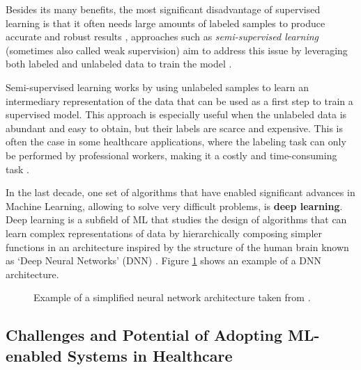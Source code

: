 \documentclass[../main.tex]{subfiles}
\begin{document}
    Besides its many benefits, the most significant disadvantage of supervised learning is that it often needs large amounts of labeled samples to produce accurate and robust results \cite{lecun_deep_2015}, 
    approaches such as \textit{semi-supervised learning} (sometimes also called weak supervision) aim to address this issue by leveraging both labeled and unlabeled data to train the model \cite{zhu_semi-supervised_2008}. 
    
    Semi-supervised learning works by using unlabeled samples to learn an intermediary representation of the data that can be used as a first step to train a supervised model. This approach is especially useful when the unlabeled data is abundant and easy to obtain, but their labels are scarce and expensive. This is often the case in some healthcare applications, where the labeling task can only be performed by professional workers, making it a costly and time-consuming task \cite{yakimovich_labels_2021,chen_study_2015, figueroa_predicting_2012}.
    
    
    In the last decade, one set of algorithms that have enabled significant advances in Machine Learning, allowing to solve very difficult problems, is \textbf{deep learning}. Deep learning is a subfield of ML that studies the design of algorithms that can learn complex representations of data by hierarchically composing simpler functions in an architecture inspired by the structure of the human brain known as `Deep Neural Networks' (DNN)  \cite{lecun_deep_2015}. Figure \ref{fig:dnn_example} shows an example of a DNN architecture.
    
    \begin{figure}[H]
        \centering
        \caption{Example of a simplified neural network architecture taken from \cite{topol_high-performance_2019}.}
        \label{fig:dnn_example}
    \end{figure}

    \subsection{Challenges and Potential of Adopting ML-enabled Systems in Healthcare}
\end{document}
